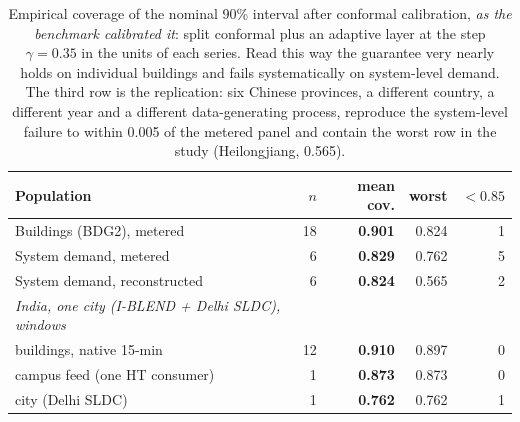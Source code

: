 \begin{table}[t]
\centering
\footnotesize
\setlength{\tabcolsep}{3pt}
\begin{tabular}{lrrrr}
\toprule
Population & $n$ & mean cov. & worst & $<0.85$ \\
\midrule
Buildings (BDG2), metered & 18 & \textbf{0.901} & 0.824 & 1 \\
System demand, metered & 6 & \textbf{0.829} & 0.762 & 5 \\
System demand, reconstructed & 6 & \textbf{0.824} & 0.565 & 2 \\
\midrule
\emph{India, one city (I-BLEND + Delhi SLDC), windows} &  &  &  &  \\
\quad buildings, native 15-min & 12 & \textbf{0.910} & 0.897 & 0 \\
\quad campus feed (one HT consumer) & 1 & \textbf{0.873} & 0.873 & 0 \\
\quad city (Delhi SLDC) & 1 & \textbf{0.762} & 0.762 & 1 \\
\bottomrule
\end{tabular}
\caption{Empirical coverage of the nominal 90\% interval after conformal calibration, \emph{as the benchmark calibrated it}: split conformal plus an adaptive layer at the step $\gamma=0.35$ in the units of each series. Read this way the guarantee very nearly holds on individual buildings and fails systematically on system-level demand. The third row is the replication: six Chinese provinces, a different country, a different year and a different data-generating process, reproduce the system-level failure to within 0.005 of the metered panel and contain the worst row in the study (Heilongjiang, 0.565).}
\label{tab:calibration}
\end{table}
